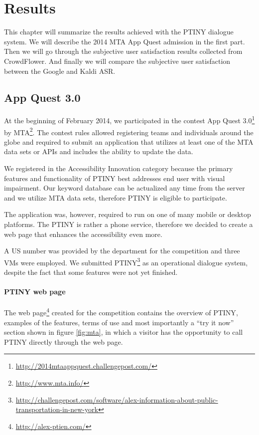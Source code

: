 \chapter{Results}

This chapter will summarize the results achieved with the \ac{PTINY} dialogue system.
We will describe the 2014 \ac{MTA} App Quest admission in the first part.
Then we will go through the subjective user satisfaction results collected from CrowdFlower.
And finally we will compare the subjective user satisfaction between the Google and Kaldi \ac{ASR}.

\section{App Quest 3.0}

At the beginning of February 2014, we participated in the contest App Quest 3.0\footnote{\url{http://2014mtaappquest.challengepost.com/}} by \acf{MTA}\footnote{\url{http://www.mta.info/}}.
The contest rules allowed registering teams and individuals around the globe and required to submit an application that utilizes at least one of the \ac{MTA} data sets or \acp{API} and includes the ability to update the data.

We registered in the Accessibility Innovation category because the primary features and functionality of \ac{PTINY} best addresses end user with visual impairment.
Our keyword database can be actualized any time from the server and we utilize \ac{MTA} data sets, therefore \ac{PTINY} is eligible to participate.

The application was, however, required to run on one of many mobile or desktop platforms.
The \ac{PTINY} is rather a phone service, therefore we decided to create a web page that enhances the accessibility even more.

A US number was provided by the department for the competition and three \acp{VM} were employed.
We submitted \ac{PTINY}\footnote{\url{http://challengepost.com/software/alex-information-about-public-transportation-in-new-york}} as an operational dialogue system, despite the fact that some features were not yet finished.

\subsubsection{\ac{PTINY} web page}

The web page\footnote{\url{http://alex-ptien.com/}} created for the competition contains the overview of \ac{PTINY}, examples of the features, terms of use and most importantly a ``try it now'' section shown in figure \ref{fig:mta}, in which a visitor has the opportunity to call \ac{PTINY} directly through the web page.

